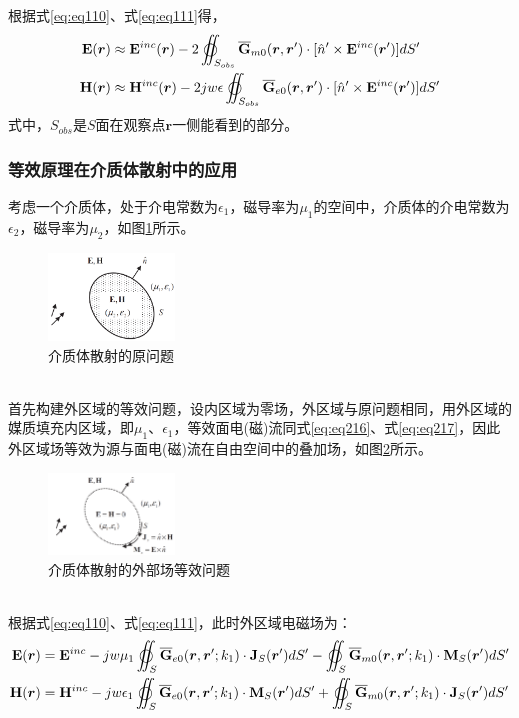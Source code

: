 \documentclass{article}
\numberwithin{equation}{section}
\renewcommand{\vec}[1]{\boldsymbol{#1}}
\begin{document}
\par
根据式\ref{eq:eq110}、式\ref{eq:eq111}得，
\begin{align}
    \label{eq:eq231}
    \mathbf{E}(\vec{r})&\approx\mathbf{E}^{inc}(\vec{r})-2\varoiint_{S_{obs}}\overline{\mathbf{G}}_{m0}(\vec{r},\vec{r}')\cdot [\hat{n}'\times\mathbf{E}^{inc}(\vec{r}')]dS' \\
    \label{eq:eq232}
    \mathbf{H}(\vec{r})&\approx\mathbf{H}^{inc}(\vec{r})-2jw\epsilon\varoiint_{S_{obs}}\overline{\mathbf{G}}_{e0}(\vec{r},\vec{r}')\cdot [\hat{n}'\times\mathbf{E}^{inc}(\vec{r}')]dS'
\end{align}
式中，$S_{obs}$是$S$面在观察点$\vec{r}$一侧能看到的部分。
\subsubsection{等效原理在介质体散射中的应用}
考虑一个介质体，处于介电常数为$\epsilon_1$，磁导率为$\mu_1$的空间中，介质体的介电常数为$\epsilon_2$，磁导率为$\mu_2$，如图\ref{fig:fig21}所示。
\begin{figure}[ht]
    \centering
    \includegraphics[width=0.3\textwidth]{介质体散射的原问题.PNG}
    \caption{介质体散射的原问题}
    \label{fig:fig21}
\end{figure}
\\
首先构建外区域的等效问题，设内区域为零场，外区域与原问题相同，用外区域的媒质填充内区域，即$\mu_1$、$\epsilon_1$，等效面电(磁)流同式\ref{eq:eq216}、式\ref{eq:eq217}，因此外区域场等效为源与面电(磁)流在自由空间中的叠加场，如图\ref{fig:fig22}所示。
\begin{figure}[ht]
    \centering
    \includegraphics[width=0.3\textwidth]{介质体散射的外部场等效问题.PNG}
    \caption{介质体散射的外部场等效问题}
    \label{fig:fig22}
\end{figure}
\\
根据式\ref{eq:eq110}、式\ref{eq:eq111}，此时外区域电磁场为：
\begin{align}
    \label{eq:eq233}
    \mathbf{E}(\vec{r})&=\mathbf{E}^{inc}-jw\mu_1\varoiint_S\overline{\mathbf{G}}_{e0}(\vec{r},\vec{r}';k_1)\cdot\mathbf{J}_S(\vec{r}')dS'-\varoiint_S\overline{\mathbf{G}}_{m0}(\vec{r},\vec{r}';k_1)\cdot\mathbf{M}_S(\vec{r}')dS' \\
    \label{eq:eq234}
    \mathbf{H}(\vec{r})&=\mathbf{H}^{inc}-jw\epsilon_1\varoiint_S\overline{\mathbf{G}}_{e0}(\vec{r},\vec{r}';k_1)\cdot\mathbf{M}_S(\vec{r}')dS'+\varoiint_S\overline{\mathbf{G}}_{m0}(\vec{r},\vec{r}';k_1)\cdot\mathbf{J}_S(\vec{r}')dS'
\end{align}
\end{document}
